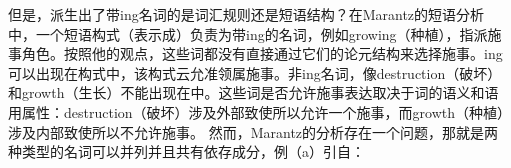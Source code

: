     但是，派生出了带ing名词的是词汇规则还是短语结构？在Marantz的\citeyearpar{Marantz97a}短语分析中，一个短语构式（表示成\vPc）负责为带ing的名词，例如growing（种植），指派施事角色。按照他的观点，这些词都没有直接通过它们的论元结构来选择施事。ing可以出现在\vPc 构式中，该构式云允准领属施事。非ing名词，像destruction（破坏）和growth（生长）不能出现在\vPc 中。这些词是否允许施事表达取决于词的语义和语用属性：destruction（破坏）涉及外部致使所以允许一个施事，而growth（种植）涉及内部致使所以不允许施事。
    然而，Marantz的分析存在一个问题，那就是两种类型的名词可以并列并且共有依存成分，例（a）引自：

